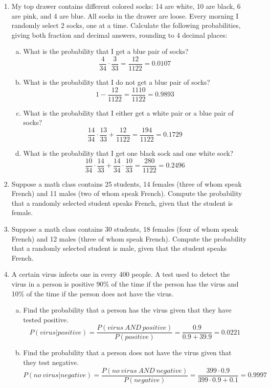 \begin{enumerate}
\item My top drawer contains different colored socks: 14 are white, 10 are black, 6 are pink, and 4 are blue. All socks in the drawer are loose. Every morning I randomly select 2 socks, one at a time. Calculate the following probabilities, giving both fraction and decimal answers, rounding to 4 decimal places:
\begin{enumerate}[(a)]
\item What is the probability that I get a blue pair of socks? 
\[\dfrac{4}{34} \cdot \dfrac{3}{33} = \dfrac{12}{1122} = 0.0107\]
\item What is the probability that I do not get a blue pair of socks? 
\[1 - \dfrac{12}{1122} = \dfrac{1110}{1122} = 0.9893\]
\item What is the probability that I either get a white pair or a blue pair of socks? 
\[\dfrac{14}{34} \cdot \dfrac{13}{33} + \dfrac{12}{1122} = \dfrac{194}{1122} = 0.1729\]
\item What is the probability that I get one black sock and one white sock? 
\[\dfrac{10}{34} \cdot \dfrac{14}{33} + \dfrac{14}{34} \cdot \dfrac{10}{33} = \dfrac{280}{1122} = 0.2496\]
\end{enumerate}

\item Suppose a math class contains 25 students, 14 females (three of whom speak French) and 11 males (two of whom speak French). Compute the probability that a randomly selected student speaks French, given that the student is female. 

\item Suppose a math class contains 30 students, 18 females (four of whom speak French) and 12 males (three of whom speak French). Compute the probability that a randomly selected student is male, given that the student speaks French. 

\item A certain virus infects one in every 400 people. A test used to detect the virus in a person is positive 90\% of the time if the person has the virus and 10\% of the time if the person does not have the virus.%
\begin{enumerate}[(a)]
\item Find the probability that a person has the virus given that they have tested positive. 
\[P(virus | positive) = \dfrac{P(virus\ AND\ positive)}{P(positive)} = \dfrac{0.9}{0.9 + 39.9} = 0.0221\]
\item Find the probability that a person does not have the virus given that they test negative. 
\[P(no\ virus | negative) = \dfrac{P(no\ virus\ AND\ negative)}{P(negative)} = \dfrac{399 \cdot 0.9}{399 \cdot 0.9 + 0.1} = 0.9997\] 
\end{enumerate}


\end{enumerate}
